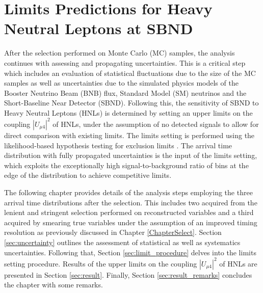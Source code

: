 \chapter{Limits Predictions for Heavy Neutral Leptons at SBND}
\label{ChapterResult}

\ifpdf
    \graphicspath{{Chapter10/Figs/Raster/}{Chapter10/Figs/PDF/}{Chapter10/Figs/}}
\else
    \graphicspath{{Chapter10/Figs/Vector/}{Chapter10/Figs/}}
\fi


After the selection performed on Monte Carlo (MC) samples, the analysis continues with assessing and propagating uncertainties.
This is a critical step which includes an evaluation of statistical fluctuations due to the size of the MC samples as well as uncertainties due to the simulated physics models of the Booster Neutrino Beam (BNB) flux, Standard Model (SM) neutrinos and the Short-Baseline Near Detector (SBND).   
Following this, the sensitivity of SBND to Heavy Neutral Leptons (HNLs) is determined by setting an upper limits on the coupling $|U_{\mu4}|^2$ of HNLs, under the assumption of no detected signals to allow for direct comparison with existing limits.
The limits setting is performed using the likelihood-based hypothesis testing for exclusion limits \cite{asymptotic_test}.
The arrival time distribution with fully propagated uncertainties is the input of the limits setting, which exploits the exceptionally high signal-to-background ratio of bins at the edge of the distribution to achieve competitive limits.

The following chapter provides details of the analysis steps employing the three arrival time distributions after the selection.
This includes two acquired from the lenient and stringent selection performed on reconstructed variables and a third acquired by smearing true variables under the assumption of an improved timing resolution as previously discussed in Chapter \ref{ChapterSelect}.
Section \ref{sec:uncertainty} outlines the assessment of statistical as well as systematics uncertainties. 
Following that, Section \ref{sec:limit_procedure} delves into the limits setting procedure.
Results of the upper limits on the coupling $|U_{\mu4}|^{2}$ of HNLs are presented in Section \ref{sec:result}.
Finally, Section \ref{sec:result_remarks} concludes the chapter with some remarks.

